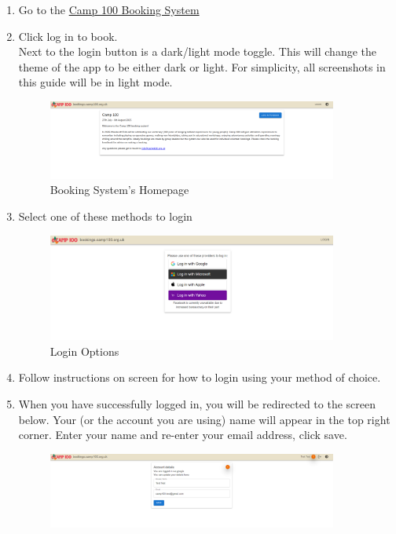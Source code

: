 \documentclass[a4paper, 11pt]{report}
\begin{document}
\begin{enumerate}
    \item Go to the \href{https://bookings.camp100.org.uk}{Camp 100 Booking System}
    \item Click log in to book.\\
    Next to the login button is a dark/light mode toggle. This will change the theme of the app to be either dark or light. For simplicity, all screenshots in this guide will be in light mode.
    \begin{figure}[H]
        \centering
        \includegraphics[width=0.9\textwidth]{assets/1-homepage.png}
        \caption{Booking System's Homepage}
    \end{figure}
    \item Select one of these methods to login
    \begin{figure}[H]
        \centering
        \includegraphics[width=0.9\textwidth]{assets/1-login.png}
        \caption{Login Options}
    \end{figure}
    \item Follow instructions on screen for how to login using your method of choice.
    \item When you have successfully logged in, you will be redirected to the screen below. Your (or the account you are using) name will appear in the top right corner. Enter your name and re-enter your email address, click save.
    \begin{figure}[H]
        \centering
        \includegraphics[width=0.9\textwidth]{assets/1-create-account.png}

\end{figure}
\end{enumerate}
\end{document}
